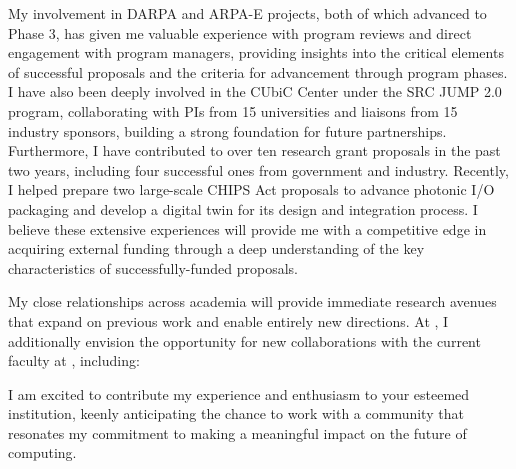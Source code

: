 My involvement in DARPA and ARPA-E projects, both of which advanced to Phase 3, has given me valuable experience with program reviews and direct engagement with program managers, providing insights into the critical elements of successful proposals and the criteria for advancement through program phases. I have also been deeply involved in the CUbiC Center under the SRC JUMP 2.0 program, collaborating with PIs from 15 universities and liaisons from 15 industry sponsors, building a strong foundation for future partnerships. Furthermore, I have contributed to over ten research grant proposals in the past two years, including four successful ones from government and industry. Recently, I helped prepare two large-scale CHIPS Act proposals to advance photonic I/O packaging and develop a digital twin for its design and integration process. I believe these extensive experiences will provide me with a competitive edge in acquiring external funding through a deep understanding of the key characteristics of successfully-funded proposals.

My close relationships across academia will provide immediate research avenues that expand on previous work and enable entirely new directions. At \appSchoolDeptShort{}, I additionally envision the opportunity for new collaborations with the current faculty at \appSchoolShort{}, including:
\begin{enumerate*}[label=(\roman*)]
    \appCollab{}
\end{enumerate*}
I am excited to contribute my experience
and enthusiasm to your esteemed institution, keenly anticipating the chance to work with a community that resonates my commitment to making a meaningful impact on the future of computing.